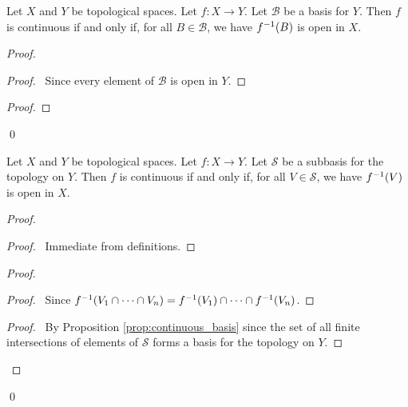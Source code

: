 \begin{prop}
\label{prop:continuous_basis}
Let $X$ and $Y$ be topological spaces. Let $f : X \rightarrow Y$. Let $\mathcal{B}$ be a basis for $Y$. Then $f$ is continuous if and only if, for all $B \in \mathcal{B}$, we have ${f}^{-1}(B)$ is open in $X$.
\end{prop}

\begin{proof}
\pf
{}
\begin{proof}
	\pf\ Since every element of $\mathcal{B}$ is open in $Y$.
\end{proof}
\begin{proof}
\end{proof}
\qed
\end{proof}

\begin{prop}
Let $X$ and $Y$ be topological spaces.
Let $f : X \rightarrow Y$. Let $\mathcal{S}$ be a subbasis for the topology on $Y$. Then $f$ is continuous if and only if, for all $V \in \mathcal{S}$, we have ${f}^{-1}(V)$ is open in $X$.
\end{prop}

\begin{proof}
\pf
{}
\begin{proof}
	\pf\ Immediate from definitions.
\end{proof}
\begin{proof}
	\begin{proof}
		\pf\ Since ${f}^{-1}(V_1 \cap \cdots \cap V_n) = {f}^{-1}(V_1) \cap \cdots \cap {f}^{-1}(V_n)$.
	\end{proof}
	\qedstep
	\begin{proof}
		\pf\ By Proposition \ref{prop:continuous_basis} since the set of all finite intersections of elements of $\mathcal{S}$ forms a basis for the topology on $Y$.
	\end{proof}
\end{proof}
\qed
\end{proof}

